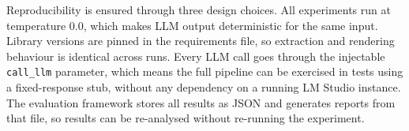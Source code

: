 Reproducibility is ensured through three design choices. All experiments run at
temperature 0.0, which makes LLM output deterministic for the same input.
Library versions are pinned in the requirements file, so extraction and rendering
behaviour is identical across runs. Every LLM call goes through the injectable
\texttt{call\_llm} parameter, which means the full pipeline can be exercised in
tests using a fixed-response stub, without any dependency on a running LM Studio
instance.
The evaluation framework stores all results as JSON and generates reports from that file, so results can be re-analysed without re-running the experiment.
